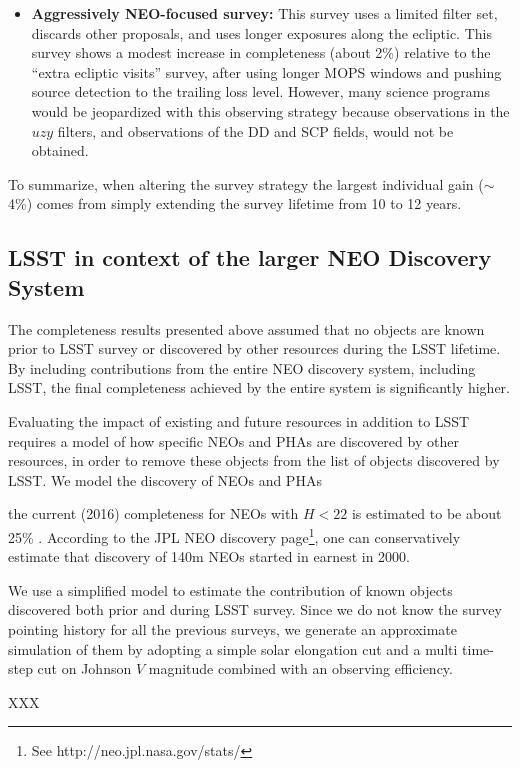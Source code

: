 \begin{itemize}
\item \textbf{Aggressively NEO-focused survey:} This survey uses a limited filter set, discards other proposals, and uses longer exposures along the ecliptic. This survey shows a modest increase in completeness (about 2\%) relative to the ``extra ecliptic visits'' survey, after using longer MOPS windows and pushing source detection to the trailing loss level.
However, many science programs would be jeopardized with this observing strategy because observations in the $uzy$ filters,
and observations of the DD and SCP fields, would not be obtained.
\end{itemize}

To summarize, when altering the survey strategy the largest individual gain ($\sim$4\%)
comes from simply extending the survey lifetime from 10 to 12 years. 

\subsection{LSST in context of the larger NEO Discovery System\label{sec:known}}

The completeness results presented above assumed that no objects are known prior to LSST survey or 
discovered by other resources during the LSST lifetime. By including contributions from the entire NEO 
discovery system, including LSST, the final completeness achieved by the entire system is significantly higher.

Evaluating the impact of existing and future resources in addition to LSST requires a model of how 
specific NEOs and PHAs are discovered by other resources, in order to remove these objects
from the list of objects discovered by LSST. We model the discovery of NEOs and PHAs 

 the current (2016)
completeness for NEOs with $H<22$ is estimated to be about 25\% \citep{GMS2016}. According to the JPL NEO discovery page\footnote{See http://neo.jpl.nasa.gov/stats/}, one can conservatively estimate that
discovery of 140m NEOs started in earnest in 2000.

We use a simplified model to estimate the contribution of known objects discovered both prior
and during LSST survey. Since we do not know the
survey pointing history for all the previous surveys, we generate an approximate simulation of them by adopting
a simple solar elongation cut and a multi time-step cut on Johnson $V$ magnitude combined with an observing efficiency. 

XXX

